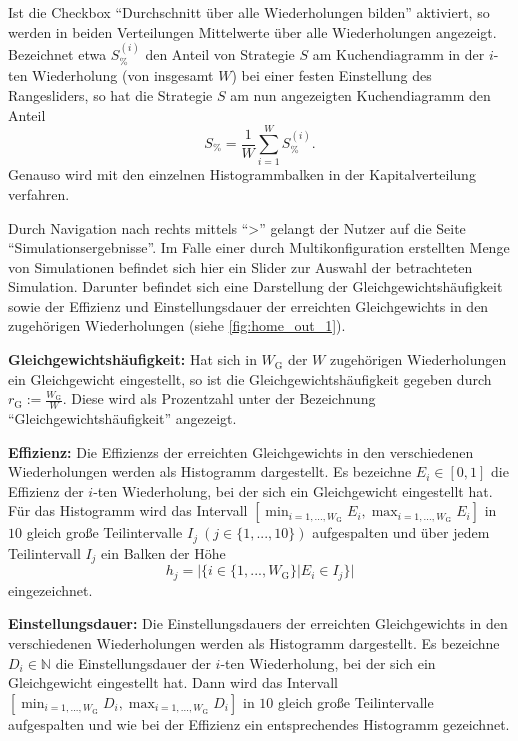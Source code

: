 \documentclass[parskip=full,11pt]{scrartcl}
\begin{document}
Ist die Checkbox \enquote{Durchschnitt über alle Wiederholungen bilden} aktiviert, so werden in beiden Verteilungen Mittelwerte über alle Wiederholungen angezeigt. Bezeichnet etwa \(S_\%^{(i)}\) den Anteil von Strategie \(S\) am Kuchendiagramm in der \(i\)-ten Wiederholung (von insgesamt \(W\)) bei einer festen Einstellung des Rangesliders, so hat die Strategie \(S\) am nun angezeigten Kuchendiagramm den Anteil
\[
S_\% = \frac 1W \sum_{i=1}^W S_\%^{(i)}.
\]
Genauso wird mit den einzelnen Histogrammbalken in der Kapitalverteilung verfahren.

Durch Navigation nach rechts mittels \enquote{>} gelangt der \Gls{Nutzer} auf die Seite \enquote{Simulationsergebnisse}. Im Falle einer durch Multikonfiguration erstellten Menge von Simulationen befindet sich hier ein Slider zur Auswahl der betrachteten Simulation. Darunter befindet sich eine Darstellung der Gleichgewichtshäufigkeit sowie der \Gls{Effizienz} und \Gls{Einstellungsdauer} der erreichten \Glspl{Gleichgewicht} in den zugehörigen Wiederholungen (siehe \cref{fig:home_out_1}).

\textbf{Gleichgewichtshäufigkeit:}
Hat sich in \(W_\text{G}\) der \(W\) zugehörigen Wiederholungen ein \Gls{Gleichgewicht} eingestellt, so ist die Gleichgewichtshäufigkeit gegeben durch \(r_\text{G} := \frac{W_\text{G}}{W}\). Diese wird als Prozentzahl unter der Bezeichnung \enquote{Gleichgewichtshäufigkeit} angezeigt.

\textbf{\Gls{Effizienz}:}
Die \Glspl{Effizienz} der erreichten \Glspl{Gleichgewicht} in den verschiedenen Wiederholungen werden als Histogramm dargestellt. Es bezeichne \(E_i \in [0,1]\) die \Gls{Effizienz} der \(i\)-ten Wiederholung, bei der sich ein \Gls{Gleichgewicht} eingestellt hat. Für das Histogramm wird das Intervall \([\min_{i = 1,...,W_\text{G}} E_i, \max_{i = 1,...,W_\text{G}} E_i]\) in \(10\) gleich große Teilintervalle \(I_j  \ (j \in \{1,...,10\})\) aufgespalten und über jedem Teilintervall \(I_j\) ein Balken der Höhe
\[
h_j = |\{i \in \{1,...,W_\text{G}\} | E_i \in I_j\}|
\]
eingezeichnet.

\textbf{\Gls{Einstellungsdauer}:}
Die \Glspl{Einstellungsdauer} der erreichten \Glspl{Gleichgewicht} in den verschiedenen Wiederholungen werden als Histogramm dargestellt. Es bezeichne \(D_i \in \mathbb{N}\) die \Gls{Einstellungsdauer} der \(i\)-ten Wiederholung, bei der sich ein \Gls{Gleichgewicht} eingestellt hat. Dann wird das Intervall \([\min_{i = 1,...,W_\text{G}} D_i, \max_{i = 1,...,W_\text{G}} D_i]\) in \(10\) gleich große Teilintervalle aufgespalten und wie bei der \Gls{Effizienz} ein entsprechendes Histogramm gezeichnet.
\end{document}
